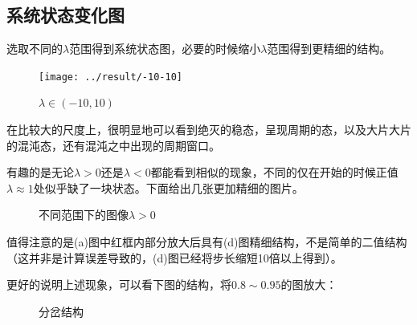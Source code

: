 \documentclass[UTF8]{ctexart}
\begin{document}
	\subsection{系统状态变化图}
	
	\begin{flushleft}
		选取不同的$\lambda$范围得到系统状态图，必要的时候缩小$\lambda$范围得到更精细的结构。
	\end{flushleft}
	
		\begin{figure}[H]
			\centering\texttt{[image: ../result/-10-10]}
			\caption{$\lambda\in(-10,10)$}
			\end{figure}
	
\begin{flushleft}
		在比较大的尺度上，很明显地可以看到绝灭的稳态，呈现周期的态，以及大片大片的混沌态，还有混沌之中出现的周期窗口。
	
	有趣的是无论$\lambda>0$还是$\lambda<0$都能看到相似的现象，不同的仅在开始的时候正值$\lambda\approx1$处似乎缺了一块状态。下面给出几张更加精细的图片。
	
	
\end{flushleft}
	
\begin{figure}[H]
			\centering  %
			\caption{不同范围下的图像$\lambda>0$}
	\end{figure}
	
	\begin{flushleft}
		值得注意的是(a)图中红框内部分放大后具有(d)图精细结构，不是简单的二值结构（这并非是计算误差导致的，(d)图已经将步长缩短10倍以上得到）。
	
	更好的说明上述现象，可以看下图的结构，将$0.8\sim0.95$的图放大：
	\end{flushleft}
	
	\begin{figure}[H]
		\centering  %
		\caption{分岔结构}
	\end{figure}
	
\end{document}
